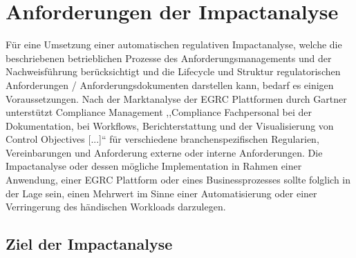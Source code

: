 \chapter{Anforderungen der Impactanalyse}

    Für eine Umsetzung einer automatischen regulativen Impactanalyse, welche die beschriebenen betrieblichen Prozesse des Anforderungsmanagements und der Nachweisführung berücksichtigt und die Lifecycle und Struktur regulatorischen Anforderungen / Anforderungsdokumenten darstellen kann, bedarf es einigen Voraussetzungen.  
    Nach der Marktanalyse der \ac{EGRC} Plattformen durch Gartner\cite{app_gartner} unterstützt Compliance Management ,,Compliance Fachpersonal bei der Dokumentation, bei Workflows, Berichterstattung und der Visualisierung von Control Objectives [...]``\cite[S.4 (übersetzt)]{app_gartner} für verschiedene branchenspezifischen Regularien, Vereinbarungen und Anforderung externe oder interne Anforderungen.       
    Die Impactanalyse oder dessen mögliche Implementation in Rahmen einer Anwendung, einer \ac{EGRC} Plattform oder eines Businessprozesses sollte folglich in der Lage sein, einen Mehrwert im Sinne einer Automatisierung oder einer Verringerung des händischen Workloads darzulegen.


    

\section{Ziel der Impactanalyse}

